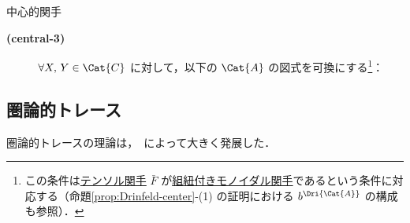 \documentclass[TQFT_main]{subfiles}
\begin{document}
\begin{mydef}[label=def:central-functor,breakable]{中心的関手}
\begin{description}
        \item[\textbf{(central-3)}] 
        $\forall X,\, Y \in \Cat{C}$ に対して，以下の $\Cat{A}$ の図式を可換にする\footnote{この条件は\hyperref[def:tensor-functor]{テンソル関手} $\bar{F}$ が\hyperref[def:braided-monoidal-functor]{組紐付きモノイダル関手}であるという条件に対応する（命題\ref{prop:Drinfeld-center}-(1) の証明における $b^{\Dri{\Cat{A}}}$ の構成も参照）．}：
        \begin{center}
        \end{center}
    \end{description}
\end{mydef}

\subsection{圏論的トレース}

圏論的トレースの理論は，~\cite{henriques2015categorifiedtracemoduletensor}によって大きく発展した．
\end{document}
